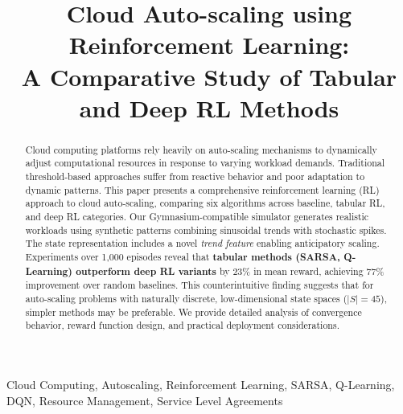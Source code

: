 \documentclass[conference]{IEEEtran}
\begin{document}
\title{Cloud Auto-scaling using Reinforcement Learning:\\
A Comparative Study of Tabular and Deep RL Methods}

\author{
\and
{}
\and
{}
}

\maketitle

\begin{abstract}
Cloud computing platforms rely heavily on auto-scaling mechanisms to dynamically adjust computational resources in response to varying workload demands. Traditional threshold-based approaches suffer from reactive behavior and poor adaptation to dynamic patterns. This paper presents a comprehensive reinforcement learning (RL) approach to cloud auto-scaling, comparing six algorithms across baseline, tabular RL, and deep RL categories. Our Gymnasium-compatible simulator generates realistic workloads using synthetic patterns combining sinusoidal trends with stochastic spikes. The state representation includes a novel \textit{trend feature} enabling anticipatory scaling. Experiments over 1,000 episodes reveal that \textbf{tabular methods (SARSA, Q-Learning) outperform deep RL variants} by 23\% in mean reward, achieving 77\% improvement over random baselines. This counterintuitive finding suggests that for auto-scaling problems with naturally discrete, low-dimensional state spaces ($|S|=45$), simpler methods may be preferable. We provide detailed analysis of convergence behavior, reward function design, and practical deployment considerations.
\end{abstract}

\begin{IEEEkeywords}
Cloud Computing, Autoscaling, Reinforcement Learning, SARSA, Q-Learning, DQN, Resource Management, Service Level Agreements
\end{IEEEkeywords}
\end{document}
